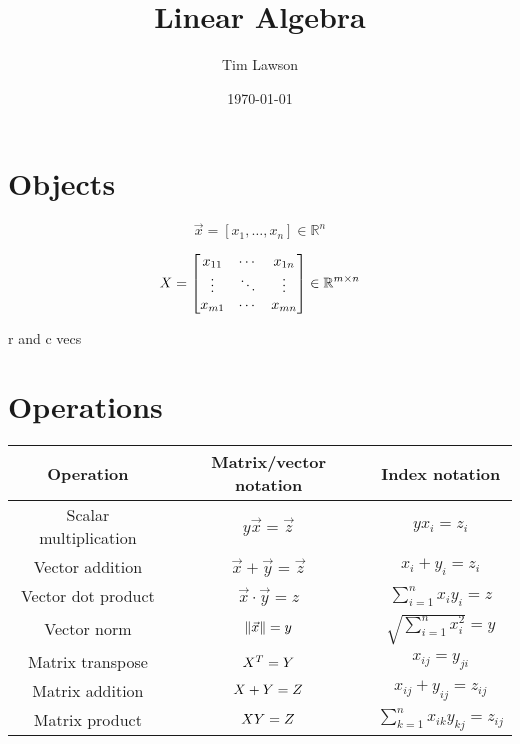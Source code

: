 \documentclass[a4paper]{extarticle}
\title{Linear Algebra}
\author{Tim Lawson}
\date{\today}
\begin{document}
\maketitle

\section{Objects}

\begin{dfn}
  [Vector]
  $$
    \vec{x} = \left[ x_{1}, \ldots, x_{n} \right]
    \in \mathbb{R}^{n}
  $$
\end{dfn}

\begin{dfn}
  [Matrix]
  $$
    X =
    \left[
      \begin{matrix}
        x_{11} & \cdots & x_{1n} \\
        \vdots & \ddots & \vdots \\
        x_{m1} & \cdots & x_{mn}
      \end{matrix}
      \right]
    \in \mathbb{R}^{m \times n}
  $$
\end{dfn}

r and c vecs

\section{Operations}

\begin{center}
  \begin{tabular}
    {ccc}
    Operation
     & Matrix/vector notation
     & Index notation                            \\
    \hline
    Scalar multiplication
     & $y \vec{x} = \vec{z}$
     & $y x_{i} = z_{i}$                         \\
    Vector addition
     & $\vec{x} + \vec{y} = \vec{z}$
     & $x_{i} + y_{i} = z_{i}$                   \\
    Vector dot product
     & $\vec{x} \cdot \vec{y} = z$
     & $\sum_{i = 1}^{n} x_{i} y_{i} = z$        \\
    Vector norm
     & $\lVert \vec{x} \rVert = y$
     & $\sqrt{\sum_{i = 1}^{n} x_{i}^2} = y$     \\
    Matrix transpose
     & $X^{T} = Y$
     & $x_{ij} = y_{ji}$                         \\
    Matrix addition
     & $X + Y = Z$
     & $x_{ij} + y_{ij} = z_{ij}$                \\
    Matrix product
     & $X Y = Z$
     & $\sum_{k = 1}^{n} x_{ik} y_{kj} = z_{ij}$ \\
  \end{tabular}
\end{center}
\end{document}
